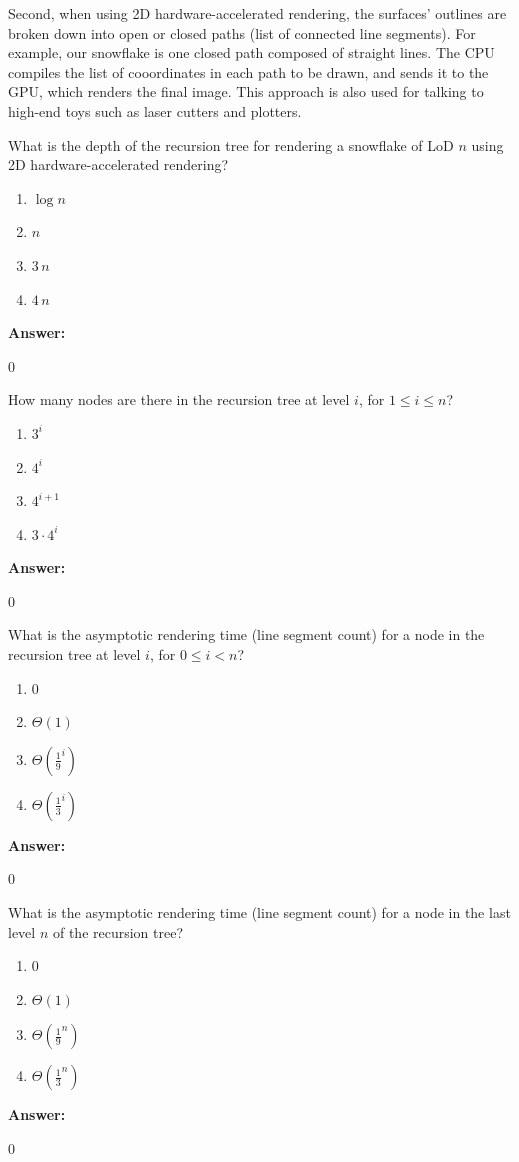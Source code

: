 \documentclass[12pt,twoside]{article}
\newcommand{\answer}{
 \par\medskip
 \textbf{Answer:}
}
\newcommand{\answerIf}{ \answer
0
}
\newcommand{\answerIg}{ \answer
0
}
\newcommand{\answerIh}{ \answer
0
}
\newcommand{\answerIi}{ \answer
0
}
\begin{document}
\begin{problems}
Second, when using 2D hardware-accelerated rendering, the surfaces'
outlines are broken down into open or closed paths (list of connected
line segments). For example, our snowflake is one closed path composed of
straight lines. The CPU compiles the list of cooordinates in each path to be
drawn, and sends it to the GPU, which renders the final image. This approach is
also used for talking to high-end toys such as laser cutters and plotters.

\begin{problemparts}
  \problempart {} What is the depth of the recursion tree for rendering a
  snowflake of LoD $n$ using 2D hardware-accelerated rendering?
    \begin{enumerate}
      \item $\log n$
      \item $n$
      \item $3 \, n$
      \item $4 \, n$
    \end{enumerate}
\answerIf

  \problempart {} How many nodes are there in the recursion tree at level
  $i$, for $1 \le i \le n$?
    \begin{enumerate}
      \item $3 ^ i$
      \item $4 ^ i$
      \item $4 ^ {i + 1}$
      \item $3 \cdot 4 ^ i$
    \end{enumerate}
\answerIg

  \problempart {} What is the asymptotic rendering time (line segment count)
  for a node in the recursion tree at level $i$, for $0 \le i < n$?
    \begin{enumerate}
      \item $0$
      \item $\Theta(1)$
      \item $\Theta(\frac{1}{9}^i)$
      \item $\Theta(\frac{1}{3}^i)$
    \end{enumerate}
\answerIh

  \problempart {} What is the asymptotic rendering time (line segment count)
  for a node in the last level $n$ of the recursion tree?
    \begin{enumerate}
      \item $0$
      \item $\Theta(1)$
      \item $\Theta(\frac{1}{9}^n)$
      \item $\Theta(\frac{1}{3}^n)$
    \end{enumerate}
\answerIi


\end{problemparts}
\end{problems}
\end{document}
